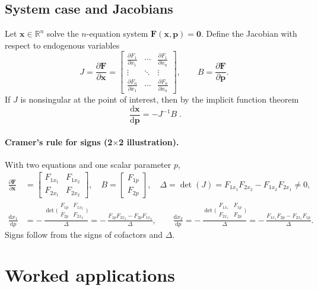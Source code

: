 \documentclass[11pt]{article}
\newcommand{\R}{\mathbb{R}}
\newcommand{\ve}[1]{\mathbf{#1}}
\newcommand{\pd}[2]{\frac{\partial #1}{\partial #2}}
\newcommand{\dtotal}[2]{\frac{\mathrm{d} #1}{\mathrm{d} #2}}
\begin{document}
\subsection{System case and Jacobians}
Let \(\ve x\in\R^n\) solve the \(n\)-equation system \(\ve F(\ve x,\ve p)=\ve 0\). Define the Jacobian with respect to endogenous variables
\[
J = \pd{\ve F}{\ve x}=
\begin{bmatrix}
\pd{F_1}{x_1} & \cdots & \pd{F_1}{x_n}\\
\vdots & \ddots & \vdots\\
\pd{F_n}{x_1} & \cdots & \pd{F_n}{x_n}
\end{bmatrix},\qquad
B=\pd{\ve F}{\ve p}.
\]
If \(J\) is nonsingular at the point of interest, then by the implicit function theorem
\[
\boxed{\;\dtotal{\ve x}{\ve p}=-J^{-1}B\; }.
\]

\paragraph{Cramer's rule for signs (2\(\times\)2 illustration).}
With two equations and one scalar parameter \(p\),
\[
\begin{aligned}
\pd{\ve F}{\ve x}
&=
\begin{bmatrix}
F_{1x_1} & F_{1x_2}\\
F_{2x_1} & F_{2x_2}
\end{bmatrix},\quad
B=
\begin{bmatrix}
F_{1p}\\
F_{2p}
\end{bmatrix},\quad
\Delta=\det(J)=F_{1x_1}F_{2x_2}-F_{1x_2}F_{2x_1}\neq 0,\\[4pt]
\dtotal{x_1}{p}
&=-\,\frac{\det\big(
\begin{smallmatrix}
\boxed{F_{1p}} & F_{1x_2}\\
\boxed{F_{2p}} & F_{2x_2}
\end{smallmatrix}\big)}{\Delta}
=-\,\frac{F_{1p}F_{2x_2}-F_{2p}F_{1x_2}}{\Delta},\qquad
\dtotal{x_2}{p}
=-\,\frac{\det\big(
\begin{smallmatrix}
F_{1x_1} & \boxed{F_{1p}}\\
F_{2x_1} & \boxed{F_{2p}}
\end{smallmatrix}\big)}{\Delta}
=-\,\frac{F_{1x_1}F_{2p}-F_{2x_1}F_{1p}}{\Delta}.
\end{aligned}
\]
Signs follow from the signs of cofactors and \(\Delta\).

\section{Worked applications}
\end{document}
